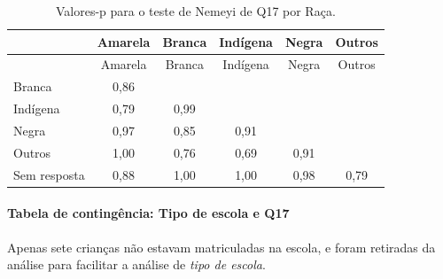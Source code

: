 \documentclass[]{article}
\let\oldparagraph\paragraph
\renewcommand{\paragraph}[1]{\oldparagraph{#1}\mbox{}}
\begin{document}
\begin{longtable}[]{@{}lccccc@{}}
\caption{\label{tab:unnamed-chunk-228}Valores-p para o teste de Nemeyi de Q17 por Raça.}\tabularnewline
\toprule
& Amarela & Branca & Indígena & Negra & Outros\tabularnewline
\midrule
\endfirsthead
\toprule
& Amarela & Branca & Indígena & Negra & Outros\tabularnewline
\midrule
\endhead
Branca & 0,86 & & & &\tabularnewline
Indígena & 0,79 & 0,99 & & &\tabularnewline
Negra & 0,97 & 0,85 & 0,91 & &\tabularnewline
Outros & 1,00 & 0,76 & 0,69 & 0,91 &\tabularnewline
Sem resposta & 0,88 & 1,00 & 1,00 & 0,98 & 0,79\tabularnewline
\bottomrule
\end{longtable}

\cleardoublepage

\hypertarget{tabela-de-continguxeancia-tipo-de-escola-e-q17}{%
\paragraph{Tabela de contingência: Tipo de escola e Q17}\label{tabela-de-continguxeancia-tipo-de-escola-e-q17}}

Apenas sete crianças não estavam matriculadas na escola, e foram retiradas da análise para facilitar a análise de \emph{tipo de escola}.
\end{document}
